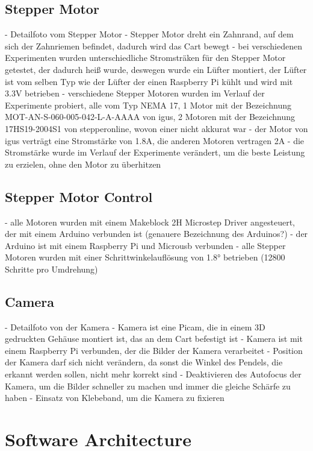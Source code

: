 \subsection{Stepper Motor}
- Detailfoto vom Stepper Motor
- Stepper Motor dreht ein Zahnrand, auf dem sich der Zahnriemen befindet, dadurch wird das Cart bewegt
- bei verschiedenen Experimenten wurden unterschiedliche Stromsträken für den Stepper Motor getestet, der dadurch heiß wurde, deswegen wurde ein Lüfter montiert, der Lüfter ist vom selben Typ wie der Lüfter der einen Raspberry Pi kühlt und wird mit 3.3V betrieben
- verschiedene Stepper Motoren wurden im Verlauf der Experimente probiert, alle vom Typ NEMA 17, 1 Motor mit der Bezeichnung MOT-AN-S-060-005-042-L-A-AAAA von igus, 2 Motoren mit der Bezeichnung 17HS19-2004S1 von stepperonline, wovon einer nicht akkurat war
- der Motor von igus verträgt eine Stromstärke von 1.8A, die anderen Motoren vertragen 2A
- die Stromstärke wurde im Verlauf der Experimente verändert, um die beste Leistung zu erzielen, ohne den Motor zu überhitzen

\subsection{Stepper Motor Control}
- alle Motoren wurden mit einem Makeblock 2H Microstep Driver angesteuert, der mit einem Arduino verbunden ist (genauere Bezeichnung des Arduinos?)
- der Arduino ist mit einem Raspberry Pi und Microusb verbunden
- alle Stepper Motoren wurden mit einer Schrittwinkelauflösung von 1.8° betrieben (12800 Schritte pro Umdrehung)

\subsection{Camera}
- Detailfoto von der Kamera
- Kamera ist eine Picam, die in einem 3D gedruckten Gehäuse montiert ist, das an dem Cart befestigt ist
- Kamera ist mit einem Raspberry Pi verbunden, der die Bilder der Kamera verarbeitet
- Position der Kamera darf sich nicht verändern, da sonst die Winkel des Pendels, die erkannt werden sollen, nicht mehr korrekt sind
- Deaktivieren des Autofocus der Kamera, um die Bilder schneller zu machen und immer die gleiche Schärfe zu haben
- Einsatz von Klebeband, um die Kamera zu fixieren

\section{Software Architecture}
